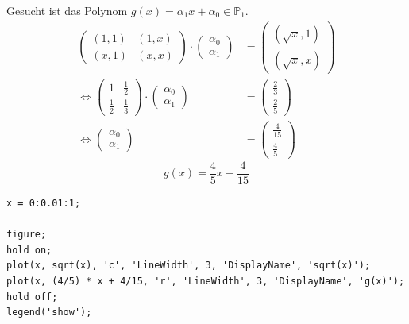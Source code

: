 \documentclass[10pt,a4paper]{article}
\begin{document}
Gesucht ist das Polynom $g(x) = \alpha_{1}x + \alpha_{0} \in \mathbb{P}_{1}$.
\begin{align*}
  \begin{pmatrix}
    (1, 1) & (1, x)\\
    (x, 1) & (x, x)
  \end{pmatrix}
  \cdot
  \begin{pmatrix}
    \alpha_{0}\\\alpha_{1}
  \end{pmatrix}
  & =
  \begin{pmatrix}
    (\sqrt{x}, 1)\\
    (\sqrt{x}, x)
  \end{pmatrix}
  \\
  \Leftrightarrow
  \begin{pmatrix}
    1 & \frac{1}{2}\\
    \frac{1}{2} & \frac{1}{3}
  \end{pmatrix}
  \cdot
  \begin{pmatrix}
    \alpha_{0}\\\alpha_{1}
  \end{pmatrix}
  & =
  \begin{pmatrix}
    \frac{2}{3}\\
    \frac{2}{5}
  \end{pmatrix}
  \\
  \Leftrightarrow
  \begin{pmatrix}
    \alpha_{0}\\\alpha_{1}
  \end{pmatrix}
  & =
  \begin{pmatrix}
    \frac{4}{15}\\
    \frac{4}{5}
  \end{pmatrix}
\end{align*}
\begin{equation}
  g(x) = \frac{4}{5}x + \frac{4}{15}
\end{equation}

\begin{lstlisting}
x = 0:0.01:1;

figure;
hold on;
plot(x, sqrt(x), 'c', 'LineWidth', 3, 'DisplayName', 'sqrt(x)');
plot(x, (4/5) * x + 4/15, 'r', 'LineWidth', 3, 'DisplayName', 'g(x)');
hold off;
legend('show');
\end{lstlisting}
\end{document}
